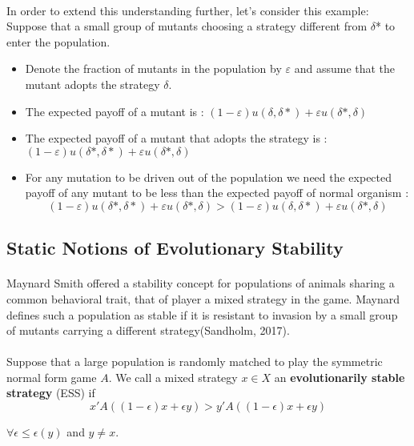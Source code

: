 \paragraph{}In order to extend this understanding further, let's consider this example:
Suppose that a small group of mutants choosing a strategy different from $\delta$* to enter the population.
\begin{itemize}
\item Denote the fraction of mutants in the population by $\varepsilon$ and assume that the mutant adopts the strategy $\delta$.
\item The expected payoff of a mutant is : 
	$(1-\varepsilon)u(\delta,\delta*)+\varepsilon u(\delta*,\delta)$
\item The expected payoff of a mutant that adopts the strategy is :	\\
	$(1-\varepsilon)u(\delta*,\delta*)+\varepsilon u(\delta*,\delta)$
	\item For any mutation to be driven out of the population we need the expected payoff of any mutant to be less than the expected payoff of normal organism :\\
	\begin{equation}(1-\varepsilon)u(\delta*,\delta*)+\varepsilon u(\delta*,\delta) > (1-\varepsilon)u(\delta,\delta*)+\varepsilon u(\delta*,\delta)  \end{equation}
\end{itemize}
\subsection{Static Notions of Evolutionary Stability}
\paragraph{}Maynard Smith offered a stability concept for populations of animals sharing a common behavioral trait, that of player a mixed strategy in  the game. Maynard defines such a population as stable if it is resistant to invasion by a small group of mutants carrying a different strategy(Sandholm, 2017).
\paragraph{}Suppose that a large population is randomly matched to play the symmetric normal form game $A$. We call a mixed strategy $x \in X$ an \textbf{evolutionarily stable strategy} (ESS) if 
\begin{equation}\label{eq:55}
x' A((1 - \epsilon)x + \epsilon y) > y' A((1 - \epsilon)x + \epsilon y) 
\end{equation}
\begin{center}
$\forall \epsilon \leq \epsilon(y)$ and $y \neq x.$
\end{center}
